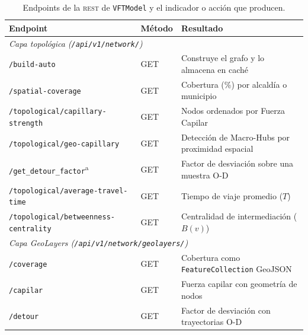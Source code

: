 \begin{table}[H]
    \centering
    \small
    \caption[\api{} REST de \texttt{VFTModel}: endpoints disponibles]{Endpoints de la
    \api{} \textsc{rest} de \texttt{VFTModel} y el indicador o acción que producen.
    }
    \label{tab:vft-endpoints}
    \begin{tabularx}{\textwidth}{|l|l|X|}
        \hline
        \textbf{Endpoint} & \textbf{Método} & \textbf{Resultado} \\
        \hline
        \multicolumn{3}{|l|}{\textit{Capa topológica (\texttt{/api/v1/network/})}} \\
        \hline
        \texttt{/build-auto}
            & GET  & Construye el grafo y lo almacena en caché \\
        \texttt{/spatial-coverage}
            & GET  & Cobertura (\%) por alcaldía o municipio \\
        \texttt{/topological/capillary-strength}
            & GET  & Nodos ordenados por Fuerza Capilar \\
        \texttt{/topological/geo-capillary}
            & GET  & Detección de Macro-Hubs por proximidad espacial \\
        \texttt{/get\_detour\_factor}\textsuperscript{a}
            & GET  & Factor de desviación sobre una muestra O-D \\
        \texttt{/topological/average-travel-time}
            & GET  & Tiempo de viaje promedio ($T$) \\
        \texttt{/topological/betweenness-centrality}
            & GET  & Centralidad de intermediación ($B(v)$) \\
        \hline
        \multicolumn{3}{|l|}{\textit{Capa GeoLayers (\texttt{/api/v1/network/geolayers/})}} \\
        \hline
        \texttt{/coverage}
            & GET  & Cobertura como \texttt{FeatureCollection} GeoJSON \\
        \texttt{/capilar}
            & GET  & Fuerza capilar con geometría de nodos \\
        \texttt{/detour}
            & GET  & Factor de desviación con trayectorias O-D \\
        \hline
    \end{tabularx}
    \vspace{0.3em}

\end{table}

